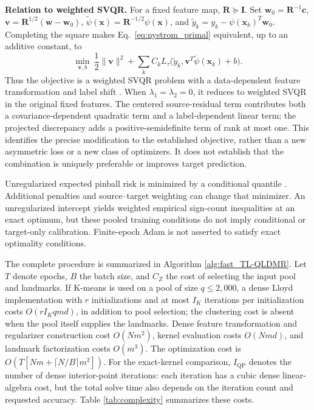 \begin{remark}
{\color{blue}\textbf{Relation to weighted SVQR.} For a fixed feature map, $\boldsymbol{R}\succeq\boldsymbol{I}$. Set $\boldsymbol{w}_0=\boldsymbol{R}^{-1}\boldsymbol{c}$, $\boldsymbol{v}=\boldsymbol{R}^{1/2}(\boldsymbol{w}-\boldsymbol{w}_0)$, $\widetilde\psi(\boldsymbol{x})=\boldsymbol{R}^{-1/2}\psi(\boldsymbol{x})$, and $\widetilde y_k=y_k-\psi(\boldsymbol{x}_k)^T\boldsymbol{w}_0$. Completing the square makes Eq.~\eqref{eq:nystrom_primal} equivalent, up to an additive constant, to
\begin{equation}
\label{eq:weighted_svqr_relation}
\min_{\boldsymbol{v},b}\ \frac12\|\boldsymbol{v}\|^2+\sum_k C_k L_\tau\bigl(\widetilde y_k,\boldsymbol{v}^T\widetilde\psi(\boldsymbol{x}_k)+b\bigr).
\end{equation}
Thus the objective is a weighted SVQR problem with a data-dependent feature transformation and label shift \citep{takeuchi2006nonparametric}. When $\lambda_1=\lambda_2=0$, it reduces to weighted SVQR in the original fixed features. The centered source-residual term contributes both a covariance-dependent quadratic term and a label-dependent linear term; the projected discrepancy adds a positive-semidefinite term of rank at most one. This identifies the precise modification to the established objective, rather than a new asymmetric loss or a new class of optimizers. It does not establish that the combination is uniquely preferable or improves target prediction.}
\end{remark}

{\color{blue}Unregularized expected pinball risk is minimized by a conditional quantile \citep{takeuchi2006nonparametric}. Additional penalties and source--target weighting can change that minimizer. An unregularized intercept yields weighted empirical sign-count inequalities at an exact optimum, but these pooled training conditions do not imply conditional or target-only calibration. Finite-epoch Adam is not asserted to satisfy exact optimality conditions.}

The complete procedure is summarized in Algorithm \ref{alg:fast_TL-QLDMR}. {\color{blue}Let $T$ denote epochs, $B$ the batch size, and $C_Z$ the cost of selecting the input pool and landmarks. If K-means is used on a pool of size $q\le2{,}000$, a dense Lloyd implementation with $r$ initializations and at most $I_K$ iterations per initialization costs $O(rI_Kqmd)$, in addition to pool selection; the clustering cost is absent when the pool itself supplies the landmarks. Dense feature transformation and regularizer construction cost $O(Nm^2)$, kernel evaluation costs $O(Nmd)$, and landmark factorization costs $O(m^3)$. The optimization cost is $O(T[Nm+\lceil N/B\rceil m^2])$. For the exact-kernel comparison, $I_{\mathrm{QP}}$ denotes the number of dense interior-point iterations: each iteration has a cubic dense linear-algebra cost, but the total solve time also depends on the iteration count and requested accuracy.} Table \ref{tab:complexity} summarizes these costs.

